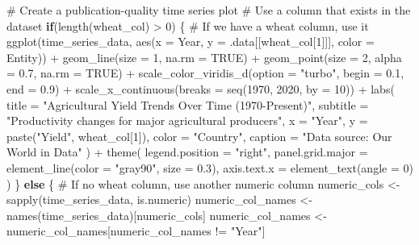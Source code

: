 \documentclass[
  letterpaper,
]{book}
\newenvironment{Shaded}{\begin{snugshade}}{\end{snugshade}}
\newcommand{\AttributeTok}[1]{\textcolor[rgb]{0.40,0.45,0.13}{#1}}
\newcommand{\CommentTok}[1]{\textcolor[rgb]{0.37,0.37,0.37}{#1}}
\newcommand{\ConstantTok}[1]{\textcolor[rgb]{0.56,0.35,0.01}{#1}}
\newcommand{\ControlFlowTok}[1]{\textcolor[rgb]{0.00,0.23,0.31}{\textbf{#1}}}
\newcommand{\DecValTok}[1]{\textcolor[rgb]{0.68,0.00,0.00}{#1}}
\newcommand{\FloatTok}[1]{\textcolor[rgb]{0.68,0.00,0.00}{#1}}
\newcommand{\FunctionTok}[1]{\textcolor[rgb]{0.28,0.35,0.67}{#1}}
\newcommand{\NormalTok}[1]{\textcolor[rgb]{0.00,0.23,0.31}{#1}}
\newcommand{\OtherTok}[1]{\textcolor[rgb]{0.00,0.23,0.31}{#1}}
\newcommand{\SpecialCharTok}[1]{\textcolor[rgb]{0.37,0.37,0.37}{#1}}
\newcommand{\StringTok}[1]{\textcolor[rgb]{0.13,0.47,0.30}{#1}}
\begin{document}
\begin{Shaded}
\begin{Highlighting}[]
\CommentTok{\# Create a publication{-}quality time series plot}
\CommentTok{\# Use a column that exists in the dataset}
\ControlFlowTok{if}\NormalTok{(}\FunctionTok{length}\NormalTok{(wheat\_col) }\SpecialCharTok{\textgreater{}} \DecValTok{0}\NormalTok{) \{}
  \CommentTok{\# If we have a wheat column, use it}
  \FunctionTok{ggplot}\NormalTok{(time\_series\_data, }\FunctionTok{aes}\NormalTok{(}\AttributeTok{x =}\NormalTok{ Year, }\AttributeTok{y =}\NormalTok{ .data[[wheat\_col[}\DecValTok{1}\NormalTok{]]], }\AttributeTok{color =}\NormalTok{ Entity)) }\SpecialCharTok{+}
    \FunctionTok{geom\_line}\NormalTok{(}\AttributeTok{size =} \DecValTok{1}\NormalTok{, }\AttributeTok{na.rm =} \ConstantTok{TRUE}\NormalTok{) }\SpecialCharTok{+}
    \FunctionTok{geom\_point}\NormalTok{(}\AttributeTok{size =} \DecValTok{2}\NormalTok{, }\AttributeTok{alpha =} \FloatTok{0.7}\NormalTok{, }\AttributeTok{na.rm =} \ConstantTok{TRUE}\NormalTok{) }\SpecialCharTok{+}
    \FunctionTok{scale\_color\_viridis\_d}\NormalTok{(}\AttributeTok{option =} \StringTok{"turbo"}\NormalTok{, }\AttributeTok{begin =} \FloatTok{0.1}\NormalTok{, }\AttributeTok{end =} \FloatTok{0.9}\NormalTok{) }\SpecialCharTok{+}
    \FunctionTok{scale\_x\_continuous}\NormalTok{(}\AttributeTok{breaks =} \FunctionTok{seq}\NormalTok{(}\DecValTok{1970}\NormalTok{, }\DecValTok{2020}\NormalTok{, }\AttributeTok{by =} \DecValTok{10}\NormalTok{)) }\SpecialCharTok{+}
    \FunctionTok{labs}\NormalTok{(}
      \AttributeTok{title =} \StringTok{"Agricultural Yield Trends Over Time (1970{-}Present)"}\NormalTok{,}
      \AttributeTok{subtitle =} \StringTok{"Productivity changes for major agricultural producers"}\NormalTok{,}
      \AttributeTok{x =} \StringTok{"Year"}\NormalTok{,}
      \AttributeTok{y =} \FunctionTok{paste}\NormalTok{(}\StringTok{"Yield"}\NormalTok{, wheat\_col[}\DecValTok{1}\NormalTok{]),}
      \AttributeTok{color =} \StringTok{"Country"}\NormalTok{,}
      \AttributeTok{caption =} \StringTok{"Data source: Our World in Data"}
\NormalTok{    ) }\SpecialCharTok{+}
    \FunctionTok{theme}\NormalTok{(}
      \AttributeTok{legend.position =} \StringTok{"right"}\NormalTok{,}
      \AttributeTok{panel.grid.major =} \FunctionTok{element\_line}\NormalTok{(}\AttributeTok{color =} \StringTok{"gray90"}\NormalTok{, }\AttributeTok{size =} \FloatTok{0.3}\NormalTok{),}
      \AttributeTok{axis.text.x =} \FunctionTok{element\_text}\NormalTok{(}\AttributeTok{angle =} \DecValTok{0}\NormalTok{)}
\NormalTok{    )}
\NormalTok{\} }\ControlFlowTok{else}\NormalTok{ \{}
  \CommentTok{\# If no wheat column, use another numeric column}
\NormalTok{  numeric\_cols }\OtherTok{\textless{}{-}} \FunctionTok{sapply}\NormalTok{(time\_series\_data, is.numeric)}
\NormalTok{  numeric\_col\_names }\OtherTok{\textless{}{-}} \FunctionTok{names}\NormalTok{(time\_series\_data)[numeric\_cols]}
\NormalTok{  numeric\_col\_names }\OtherTok{\textless{}{-}}\NormalTok{ numeric\_col\_names[numeric\_col\_names }\SpecialCharTok{!=} \StringTok{"Year"}\NormalTok{]}
  

\end{Highlighting}
\end{Shaded}
\end{document}
